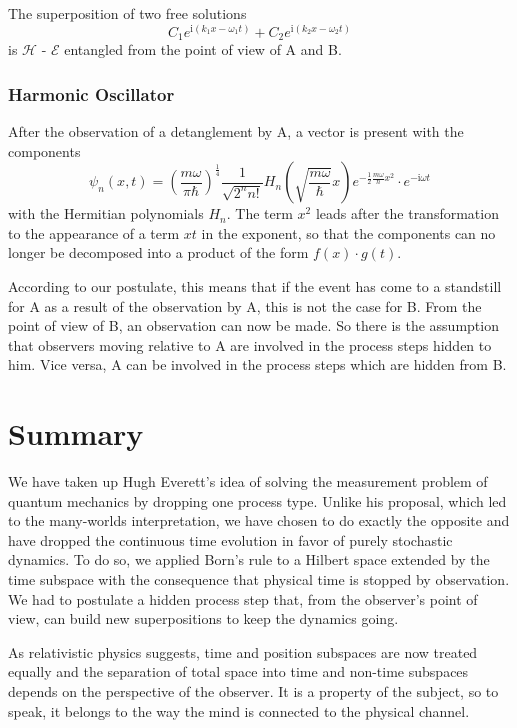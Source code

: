 \documentclass[12pt]{article}
\begin{document}
The superposition of two free solutions
\begin{equation*}
C_1 e^{\mathrm{i}(k_1 x-\omega_1 t)} + C_2 e^{\mathrm{i}(k_2 x-\omega_2 t)}
\end{equation*}
is $\mathscr{H}$ - $\mathscr{E}$ entangled from the point of view of A and B.

\subsubsection{Harmonic Oscillator}

After the observation of a detanglement by A, a vector is present with the components 
\begin{equation*}
\psi _{n}(x,t)=\left({\frac {m\omega }{\pi \hbar }}\right)^{\frac {1}{4}}{\frac {1}{\sqrt {2^{n}n!}}}H_{n}\left({\sqrt {\frac {m\omega }{\hbar }}}x\right)e^{-{\frac {1}{2}}{\frac {m\omega }{\hbar }}x^{2}} \cdot e^{-\mathrm{i}\omega t}
\end{equation*}
with the Hermitian polynomials $H_n$. The term $x^2$ leads after the transformation to the appearance of a term $xt$ in the exponent, so that the components can no longer be decomposed into a product of the form $f(x) \cdot g(t)$.

According to our postulate, this means that if the event has come to a standstill for A as a result of the observation by A, this is not the case for B. From the point of view of B, an observation can now be made. So there is the assumption that observers moving relative to A are involved in the process steps hidden to him. Vice versa, A can be involved in the process steps which are hidden from B.

\section{Summary}
We have taken up Hugh Everett's idea of solving the measurement problem of quantum mechanics by dropping one process type. Unlike his proposal, which led to the many-worlds interpretation, we have chosen to do exactly the opposite and have dropped the continuous time evolution in favor of purely stochastic dynamics. To do so, we applied Born's rule to a Hilbert space extended by the time subspace with the consequence that physical time is stopped by observation. We had to postulate a hidden process step that, from the observer's point of view, can build new superpositions to keep the dynamics going. 

As relativistic physics suggests, time and position subspaces are now treated equally and the separation of total space into time and non-time subspaces depends on the perspective of the observer. It is a property of the subject, so to speak, it belongs to the way the mind is connected to the physical channel. 
\end{document}
